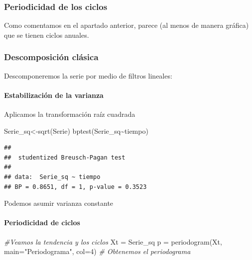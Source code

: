 \documentclass[
]{article}
\newenvironment{Shaded}{\begin{snugshade}}{\end{snugshade}}
\newcommand{\AttributeTok}[1]{\textcolor[rgb]{0.77,0.63,0.00}{#1}}
\newcommand{\CommentTok}[1]{\textcolor[rgb]{0.56,0.35,0.01}{\textit{#1}}}
\newcommand{\DecValTok}[1]{\textcolor[rgb]{0.00,0.00,0.81}{#1}}
\newcommand{\FunctionTok}[1]{\textcolor[rgb]{0.00,0.00,0.00}{#1}}
\newcommand{\NormalTok}[1]{#1}
\newcommand{\OtherTok}[1]{\textcolor[rgb]{0.56,0.35,0.01}{#1}}
\newcommand{\SpecialCharTok}[1]{\textcolor[rgb]{0.00,0.00,0.00}{#1}}
\newcommand{\StringTok}[1]{\textcolor[rgb]{0.31,0.60,0.02}{#1}}
\begin{document}
\hypertarget{periodicidad-de-los-ciclos}{%
\subsubsection{Periodicidad de los
ciclos}\label{periodicidad-de-los-ciclos}}

Como comentamos en el apartado anterior, parece (al menos de manera
gráfica) que se tienen ciclos anuales.

\hypertarget{descomposiciuxf3n-cluxe1sica}{%
\subsubsection{Descomposición
clásica}\label{descomposiciuxf3n-cluxe1sica}}

Descomponeremos la serie por medio de filtros lineales:

\hypertarget{estabilizaciuxf3n-de-la-varianza}{%
\paragraph{Estabilización de la
varianza}\label{estabilizaciuxf3n-de-la-varianza}}

Aplicamos la transformación raíz cuadrada

\begin{Shaded}
\begin{Highlighting}[]
\NormalTok{Serie\_sq}\OtherTok{\textless{}{-}}\FunctionTok{sqrt}\NormalTok{(Serie)}
\FunctionTok{bptest}\NormalTok{(Serie\_sq}\SpecialCharTok{\textasciitilde{}}\NormalTok{tiempo)}
\end{Highlighting}
\end{Shaded}

\begin{verbatim}
## 
##  studentized Breusch-Pagan test
## 
## data:  Serie_sq ~ tiempo
## BP = 0.8651, df = 1, p-value = 0.3523
\end{verbatim}

Podemos asumir varianza constante

\hypertarget{periodicidad-de-ciclos}{%
\paragraph{Periodicidad de ciclos}\label{periodicidad-de-ciclos}}

\begin{Shaded}
\begin{Highlighting}[]
\CommentTok{\#Veamos la tendencia y los ciclos }
\NormalTok{Xt }\OtherTok{=}\NormalTok{ Serie\_sq}
\NormalTok{p }\OtherTok{=} \FunctionTok{periodogram}\NormalTok{(Xt, }\AttributeTok{main=}\StringTok{"Periodograma"}\NormalTok{, }\AttributeTok{col=}\DecValTok{4}\NormalTok{) }\CommentTok{\# Obtenemos el periodograma}
\end{Highlighting}
\end{Shaded}
\end{document}
